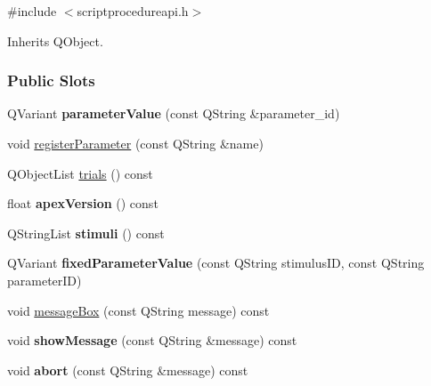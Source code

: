 \hypertarget{classapex_1_1_script_procedure_api}{
\label{classapex_1_1_script_procedure_api}
}


{\ttfamily \#include $<$scriptprocedureapi.\-h$>$}



Inherits Q\-Object.

\subsubsection*{Public Slots}
\begin{DoxyCompactItemize}
\item
\hypertarget{classapex_1_1_script_procedure_api_a7896e8d585bd3d8c3e550b647ff2e55c}{Q\-Variant {\bfseries parameter\-Value} (const Q\-String \&parameter\-\_\-id)}\label{classapex_1_1_script_procedure_api_a7896e8d585bd3d8c3e550b647ff2e55c}

\item
void \hyperlink{classapex_1_1_script_procedure_api_a92108d5374888fcafd24dd28be84dc45}{register\-Parameter} (const Q\-String \&name)
\item
Q\-Object\-List \hyperlink{classapex_1_1_script_procedure_api_a351a16fb9e8bd28a437bcc90fe589747}{trials} () const
\item
\hypertarget{classapex_1_1_script_procedure_api_adede23ea0067aa859e76e877682104db}{float {\bfseries apex\-Version} () const }\label{classapex_1_1_script_procedure_api_adede23ea0067aa859e76e877682104db}

\item
\hypertarget{classapex_1_1_script_procedure_api_a26a815876ef1537db5388b34cac15a70}{Q\-String\-List {\bfseries stimuli} () const }\label{classapex_1_1_script_procedure_api_a26a815876ef1537db5388b34cac15a70}

\item
\hypertarget{classapex_1_1_script_procedure_api_a38bfd7d68386976633defe2777e4561d}{Q\-Variant {\bfseries fixed\-Parameter\-Value} (const Q\-String stimulus\-I\-D, const Q\-String parameter\-I\-D)}\label{classapex_1_1_script_procedure_api_a38bfd7d68386976633defe2777e4561d}

\item
void \hyperlink{classapex_1_1_script_procedure_api_af00ec25de5f88c30061eec1fdecf0459}{message\-Box} (const Q\-String message) const
\item
\hypertarget{classapex_1_1_script_procedure_api_a8a0d57401b59ab7444d0bf9766c47c2f}{void {\bfseries show\-Message} (const Q\-String \&message) const }\label{classapex_1_1_script_procedure_api_a8a0d57401b59ab7444d0bf9766c47c2f}

\item
\hypertarget{classapex_1_1_script_procedure_api_ae1fd8ea2ae18a2520d697f962a3f8005}{void {\bfseries abort} (const Q\-String \&message) const }\label{classapex_1_1_script_procedure_api_ae1fd8ea2ae18a2520d697f962a3f8005}

\end{DoxyCompactItemize}
